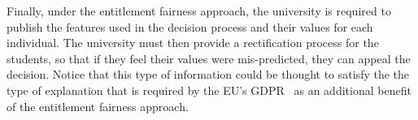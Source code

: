 Finally, under the entitlement fairness approach, the university is required to
publish the features used in the decision process and their values for each 
individual. The university must then provide a rectification process for the 
students, so that if they feel their values were mis-predicted, they can appeal
the decision. Notice that this type of information could be thought to satisfy
the the type of explanation that is required by the EU's GDPR~\citep{gdpr2016}
as an additional benefit of the entitlement fairness approach.
